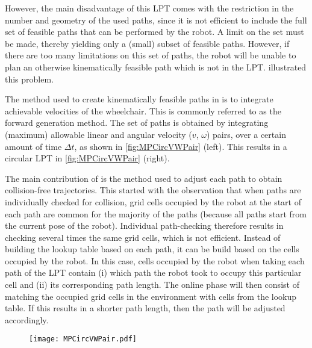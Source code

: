 However, the main disadvantage of this LPT comes with the restriction in the number and geometry of the used paths, since it is not efficient to include the full set of feasible paths that can be performed by the robot. A limit on the set must be made, thereby yielding only a (small) subset of feasible paths. However, if there are too many limitations on this set of paths, the robot will be unable to plan an otherwise kinematically feasible path which is not in the LPT.  illustrated this problem.

The method used to create kinematically feasible paths in \cite{DemeesterEtAl2012} is to integrate achievable velocities of the wheelchair. This is commonly referred to as the forward generation method. The set of paths is obtained by integrating (maximum) allowable linear and angular velocity ($v$, $\omega$) pairs, over a certain amount of time $\Delta t$, as shown in \cref{fig:MPCircVWPair} (left). This results in a circular LPT in \cref{fig:MPCircVWPair} (right).

The main contribution of \cite{DemeesterEtAl2012} is the method used to adjust each path to obtain collision-free trajectories. This started with the observation that when paths are individually checked for collision, grid cells occupied by the robot at the start of each path are common for the majority of the paths (because all paths start from the current pose of the robot). Individual path-checking therefore results in checking several times the same grid cells, which is not efficient. Instead of building the lookup table based on each path, it can be build based on the cells occupied by the robot. In this case, cells occupied by the robot when taking each path of the LPT contain (i) which path the robot took to occupy this particular cell and (ii) its corresponding path length. The online phase will then consist of matching the occupied grid cells in the environment with cells from the lookup table. If this results in a shorter path length, then the path will be adjusted accordingly. 
\begin{figure}[!htbp]
	\centering
	\texttt{[image: MPCircVWPair.pdf]}
\end{figure}


